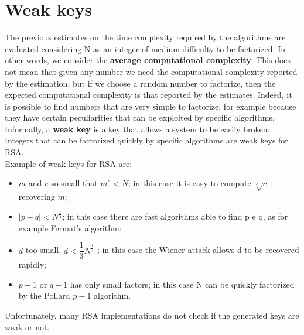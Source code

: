 \documentclass[a4paper, 10pt, titlepage]{article}
\begin{document}
\newpage
\section{Weak keys}
The previous estimates on the time complexity required by the algorithms are evaluated considering N as an integer of medium difficulty to be factorized. In other words, we consider the \textbf{average computational complexity}.
This does not mean that given any number we need the computational complexity reported by the estimation; but if we choose a random number to factorize, then the expected computational complexity is that reported by the estimates.
Indeed, it is possible to find numbers that are very simple to factorize, for example because they have certain peculiarities that can be exploited by specific algorithms.
Informally, a \textbf{weak key} is a key that allows a system to be easily broken. Integers that can be factorized quickly by specific algorithms are weak keys for RSA. \\
Example of weak keys for RSA are:
\begin{itemize}
\item $m$ and $e$ so small that $m^e < N$; in this case it is easy to compute $\sqrt[e]{c}$ recovering $m$;
\item $|p - q| < N^{\frac{1}{4}}$; in this case there are fast algorithms able to find p e q, as for example Fermat’s algorithm;
\item $d$ too small, $d < \dfrac{1}{3} N^{\frac{1}{4}}$ ; in this case the Wiener attack allows d to be recovered rapidly;
\item $p - 1$ or $q - 1$ has only small factors; in this case N can be quickly factorized by the Pollard $p - 1$ algorithm.
\end{itemize}
Unfortunately, many RSA implementations do not check if the generated
keys are weak or not.
\end{document}

